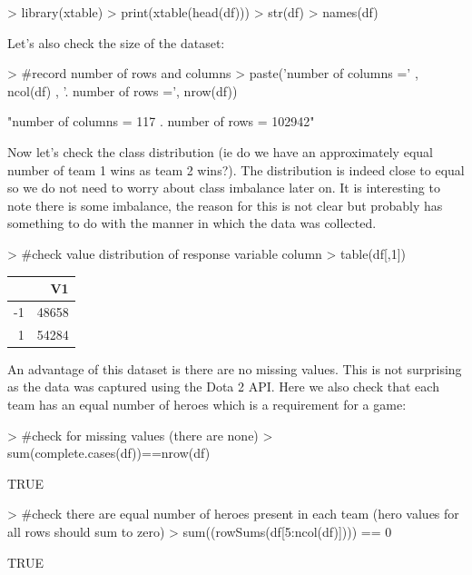 \documentclass[10pt]{article}
\begin{document}
\begin{Schunk}
\begin{Sinput}
> library(xtable)
> print(xtable(head(df)))
> str(df)
> names(df)
\end{Sinput}
\end{Schunk}
Let's also check the size of the dataset:
\begin{Schunk}
\begin{Sinput}
> #record number of rows and columns
> paste('number of columns =' , ncol(df) , '. number of rows =', nrow(df))
\end{Sinput}
\begin{Soutput}
[1] "number of columns = 117 . number of rows = 102942"
\end{Soutput}
\end{Schunk}

Now let's check the class distribution (ie do we have an approximately equal number of team 1 wins as team 2 wins?).
The distribution is indeed close to equal so we do not need to worry about class imbalance later on. It is interesting to note there is some imbalance, the reason for this is not clear but probably has something to do with the manner in which the data was collected.
\begin{Schunk}
\begin{Sinput}
> #check value distribution of response variable column
> table(df[,1])
\end{Sinput}
\end{Schunk}

\begin{table}[ht]
\centering
\begin{tabular}{rr}
  \hline
 & V1 \\ 
  \hline
-1 & 48658 \\ 
  1 & 54284 \\ 
   \hline
\end{tabular}
\end{table}

An advantage of this dataset is there are no missing values. This is not surprising as the data was captured using the Dota 2 API. Here we also check that each team has an equal number of heroes which is a requirement for a game:

\begin{Schunk}
\begin{Sinput}
> #check for missing values (there are none)
> sum(complete.cases(df))==nrow(df)
\end{Sinput}
\begin{Soutput}
[1] TRUE
\end{Soutput}
\begin{Sinput}
> #check there are equal number of heroes present in each team (hero values for all rows should sum to zero)
> sum((rowSums(df[5:ncol(df)]))) == 0
\end{Sinput}
\begin{Soutput}
[1] TRUE
\end{Soutput}
\end{Schunk}
\end{document}
